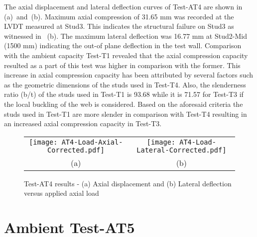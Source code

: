 The axial displacement and lateral deflection curves of Test-AT4 are shown in  (a)~and~(b). Maximum axial compression of 31.65 mm was recorded at the LVDT measured at Stud3. This indicates the structural failure on Stud3 as witnessed in ~(b). The maximum lateral deflection was 16.77 mm at Stud2-Mid (1500 mm) indicating the out-of plane deflection in the test wall. Comparison with the ambient capacity Test-T1 revealed that the axial compression capacity resulted as a part of this test was higher in comparison with the former. This increase in axial compression capacity has been attributed by several factors such as the geometric dimensions of the studs used in Test-T4. Also, the slenderness ratio (b/t) of the studs used in Test-T1 is 93.68 while it is 71.57 for Test-T3 if the local buckling of the web is considered. Based on the aforesaid criteria the studs used in Test-T1 are more slender in comparison with Test-T4 resulting in an increased axial compression capacity in Test-T3. 
\begin{figure}
	\centering
		\begin{tabular}{cc}
			\texttt{[image: AT4-Load-Axial-Corrected.pdf]} & \texttt{[image: AT4-Load-Lateral-Corrected.pdf]} \\ 
			(a) & (b)  \\ 
		\end{tabular} 
		\caption{Test-AT4 results - (a) Axial displacement and (b) Lateral deflection versus applied axial load}
		\label{fig:AT4-results}
\end{figure}

\section{Ambient Test-AT5}

